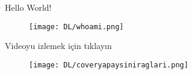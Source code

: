 \documentclass{beamer}                                                                                          %
\begin{document}
	\begin{frame}{Hello World!}
		\begin{center}
            \begin{figure}
                \vspace*{-7mm}
                \hspace*{-6}
                \texttt{[image: DL/whoami.png]}
            \end{figure}
        \end{center}
        \newline
        \centering
        Videoyu izlemek için tıklayın\par \vspace{20}
        \href{https://photos.google.com/share/AF1QipOanOkXhLz9C5X_kh61wvsGNi-phA_41yC5fE5eXjFS5w6jn8pnFkd5bqR2HwiXhw/photo/AF1QipNa76j6r0109ueElky53K9bvK78ZFzhtqlvKcSd?key=cXFVZ0NxV1J0OXJQeHdQVkxmbDY4bDlUVzNlNTR3}{\huge {}}
	\end{frame}
	
    
    \begin{frame}{}
        \begin{center}
            \begin{figure}
                \vspace*{-7mm}
                \hspace*{-18.5 pt}
                \centering
                \texttt{[image: DL/coveryapaysiniraglari.png]}
            \end{figure}
        \end{center}
    \end{frame}
    
    
\end{document}
